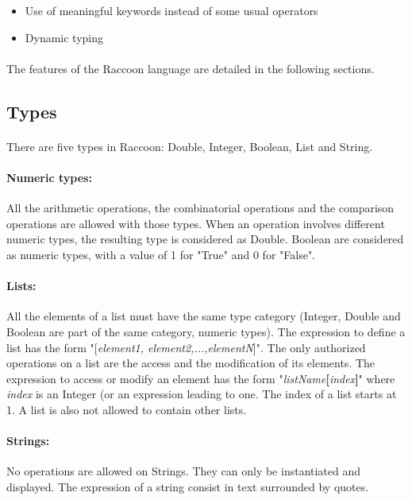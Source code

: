 \documentclass[12pt,a4paper]{article}
\begin{document}
\begin{itemize}
\item Use of meaningful keywords instead of some usual operators
\item Dynamic typing   
\end{itemize}

\paragraph{}
The features of the Raccoon language are detailed in the following sections.

\subsection{Types}
\paragraph{}
There are five types in Raccoon: Double, Integer, Boolean, List and String.

\paragraph{Numeric types:} All the arithmetic operations, the combinatorial operations and the comparison operations are allowed with those types. When an operation involves different numeric types, the resulting type is considered as Double. Boolean are considered as numeric types, with a value of 1 for "True" and 0 for "False".

\paragraph{Lists:} All the elements of a list must have the same type category (Integer, Double and Boolean are part of the same category, numeric types). The expression to define a list has the form "[\textit{element1, element2,...,elementN}]". The only authorized operations on a list are the access and the modification of its elements. The expression to access or modify an element has the form "\textit{listName}\textbf{[}\textit{index}\textbf{]}" where \textit{index} is an Integer (or an expression leading to one. The index of a list starts at 1. A list is also not allowed to contain other lists.

\paragraph{Strings:} No operations are allowed on Strings. They can only be instantiated and displayed. The expression of a string consist in text surrounded by quotes.
\end{document}
